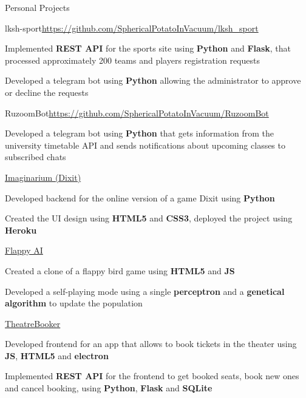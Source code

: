 \documentclass{./resume} %
\begin{document}

\begin{rSection}{Personal Projects}
    \begin{rSubsection}{lksh-sport}{\url{https://github.com/SphericalPotatoInVacuum/lksh_sport}}{}{}
        \item Implemented \textbf{REST API} for the sports site using \textbf{Python} and \textbf{Flask}, that processed approximately 200 teams and players registration requests
        \item Developed a telegram bot using \textbf{Python} allowing the administrator to approve or decline the requests
    \end{rSubsection}
    \begin{rSubsection}{RuzoomBot}{\url{https://github.com/SphericalPotatoInVacuum/RuzoomBot}}{}{}
        \item Developed a telegram bot using \textbf{Python} that gets information from the university timetable API and sends notifications about upcoming classes to subscribed chats
    \end{rSubsection}
    \begin{rSubsection}{\href{https://github.com/DKozl50/ya_dixit}{Imaginarium (Dixit)}}{}{}{}
        \item Developed backend for the online version of a game Dixit using \textbf{Python}
        \item Created the UI design using \textbf{HTML5} and \textbf{CSS3}, deployed the project using \textbf{Heroku}
    \end{rSubsection}
    \begin{rSubsection}{\href{https://github.com/SphericalPotatoInVacuum/FlappyAI}{Flappy AI}}{}{}{}
        \item Created a clone of a flappy bird game using \textbf{HTML5} and \textbf{JS}
        \item Developed a self-playing mode using a single \textbf{perceptron} and a \textbf{genetical algorithm} to update the population
    \end{rSubsection}
    \begin{rSubsection}{\href{https://github.com/SphericalPotatoInVacuum/TheatreBooker}{TheatreBooker}}{}{}{}
        \item Developed frontend for an app that allows to book tickets in the theater using \textbf{JS}, \textbf{HTML5} and \textbf{electron}
        \item Implemented \textbf{REST API} for the frontend to get booked seats, book new ones and cancel booking, using \textbf{Python}, \textbf{Flask} and \textbf{SQLite}
    \end{rSubsection}
\end{rSection}
\end{document}

